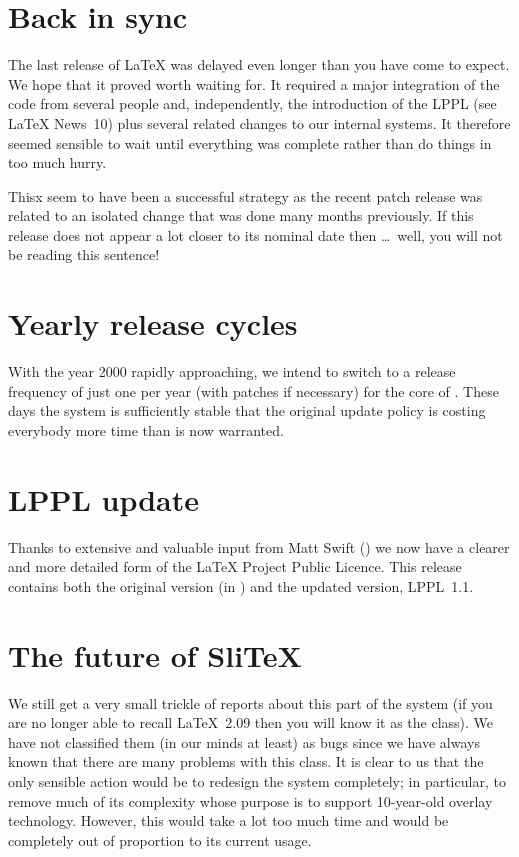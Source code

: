 \documentclass{ltnews}
\begin{document}
\maketitle

\section{Back in sync}

The last release of \LaTeX{} was delayed even longer than you have
come to expect.  We hope that it proved worth waiting for.  It
required a major integration of the code from several people and,
independently, the introduction of the LPPL (see \LaTeX{} News~10) plus
several related changes to our internal systems.  It therefore seemed
sensible to wait until everything was complete rather than do things
in too much hurry.

Thisx seem to have been a successful strategy as
the recent patch release was related to an isolated change that was
done many months previously.  If this release does not appear a lot
closer to its nominal date then \ldots~well, you will not be reading
this sentence!

\section{Yearly release cycles}

With the year 2000 rapidly approaching, we intend to switch to a
release frequency of just one per year (with patches if necessary) for
the core of \LaTeXe{}. These days the system is sufficiently stable
that the original update policy is costing everybody more time than is
now warranted.

\section{LPPL update}

Thanks to extensive and valuable input from Matt Swift
() we now have a clearer and more detailed
form of the \LaTeX{} Project Public Licence.  This release contains
both the original version (in ) and the updated
version, LPPL~1.1.

\section{The future of Sli\TeX{}}

We still get a very small trickle of reports about this part of the
system (if you are no longer able to recall \LaTeX~2.09 then you will
know it as the  class).  We have not classified them (in
our minds at least) as bugs since we have always known that there are
many problems with this class.  It is clear to us that the only
sensible action would be to redesign the system completely; in
particular, to remove much of its complexity whose purpose is to
support 10-year-old overlay technology.  However, this would take a
lot too much time and would be completely out of proportion to its
current usage.
\end{document}
